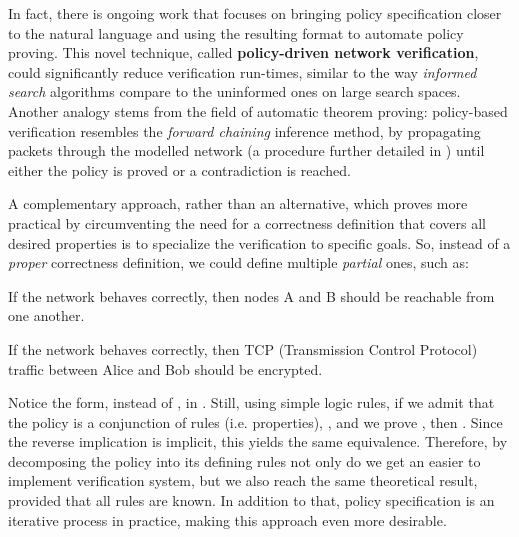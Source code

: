 In fact, there is ongoing work that focuses on bringing policy specification
closer to the natural language and using the resulting format to automate
policy proving.  This novel technique, called \textbf{policy-driven network
verification}, could significantly reduce verification run-times, similar to
the way \emph{informed search} algorithms compare to the uninformed ones on
large search spaces.  Another analogy stems from the field of automatic theorem
proving: policy-based verification resembles the \emph{forward chaining}
inference method, by propagating packets through the modelled network (a
procedure further detailed in ) until
either the policy is proved or a contradiction is reached.

A complementary approach, rather than an alternative, which proves more
practical by circumventing the need for a correctness definition that covers
all desired properties is to specialize the verification to specific goals.
So, instead of a \emph{proper} correctness definition, we could define multiple
\emph{partial} ones, such as:

\begin{definition}
If the network behaves correctly, then nodes A and B should be reachable from
one another.
\end{definition}

\begin{definition}
If the network behaves correctly, then TCP (Transmission Control
Protocol) traffic between Alice
and Bob should be encrypted.
\end{definition}

Notice the  form, instead of
, in
.  Still, using simple logic
rules, if we admit that the policy is a conjunction of rules (i.e. properties),
, and we prove
, then
.  Since the reverse implication is implicit,
this yields the same equivalence.  Therefore, by decomposing the policy into
its defining rules not only do we get an easier to implement verification
system, but we also reach the same theoretical result, provided that all rules
are known.  In addition to that, policy specification is an iterative process
in practice, making this approach even more desirable.


